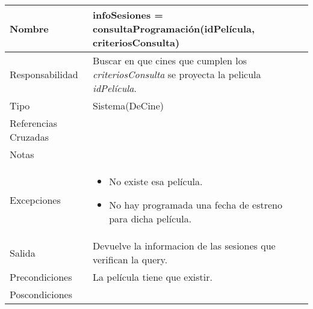 \documentclass{article}
\begin{document}
\begin{table}[h]
\begin{tabular}{|l|l|l|l|l|l|}
\hline
\multicolumn{2}{|p{3cm}|}{Nombre} & \multicolumn{4}{p{10cm}|}{\textbf{infoSesiones = consultaProgramación(idPelícula, criteriosConsulta)}}\\
\hline
\multicolumn{2}{|p{3cm}|}{Responsabilidad} & \multicolumn{4}{p{10cm}|}{Buscar en que cines que cumplen los \textit{criteriosConsulta} se proyecta la pelicula \textit{idPelícula}.} \\
\hline
\multicolumn{2}{|p{3cm}|}{Tipo} & \multicolumn{4}{p{10cm}|}{Sistema(DeCine)} \\
\hline
\multicolumn{2}{|p{3cm}|}{Referencias Cruzadas} & \multicolumn{4}{p{10cm}|}{} \\
\hline
\multicolumn{2}{|p{3cm}|}{Notas} & \multicolumn{4}{p{10cm}|}{} \\
\hline
\multicolumn{2}{|p{3cm}|}{Excepciones} & \multicolumn{4}{p{10cm}|}{\begin{itemize}
\item No existe esa película.
\item No hay programada una fecha de estreno para dicha película.
\end{itemize}} \\
\hline
\multicolumn{2}{|p{3cm}|}{Salida} & \multicolumn{4}{p{10cm}|}{Devuelve la informacion de las sesiones que verifican la query.} \\
\hline
\multicolumn{2}{|p{3cm}|}{Precondiciones} & \multicolumn{4}{p{10cm}|}{La película tiene que existir.} \\
\hline
\multicolumn{2}{|p{3cm}|}{Poscondiciones} & \multicolumn{4}{p{10cm}|}{} \\
\hline
\end{tabular}
\end{table}
\end{document}
